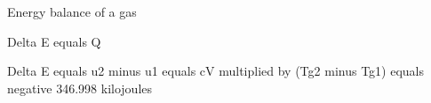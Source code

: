 Energy balance of a gas  

Delta E equals Q  

Delta E equals u2 minus u1 equals cV multiplied by (Tg2 minus Tg1) equals negative 346.998 kilojoules